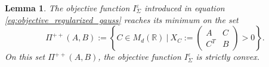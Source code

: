 \documentclass[]{article}
\numberwithin{equation}{section}
\theoremstyle{plain}
\newtheorem{lem}{Lemma}[section]
\begin{document}
\begin{lem}\label{lem:convexity_primal_obj}
    The objective function $I_\Sigma^\varepsilon$ introduced in equation \eqref{eq:objective_regularized_gauss} reaches its minimum on the set 
    \begin{equation}\label{eq:constraint_positive_mat}
    	\Pi^{++}(A,B) := \left\{ C \in M_d(\mathbb{R}) ~|~ X_C := \begin{pmatrix}
    		A & C \\
    		C^T& B
    	\end{pmatrix} > 0 \right\}.
    \end{equation} On this set $\Pi^{++}(A,B)$, the objective function $I_{\Sigma}^{\varepsilon}$ is strictly convex.
\end{lem}
\end{document}
